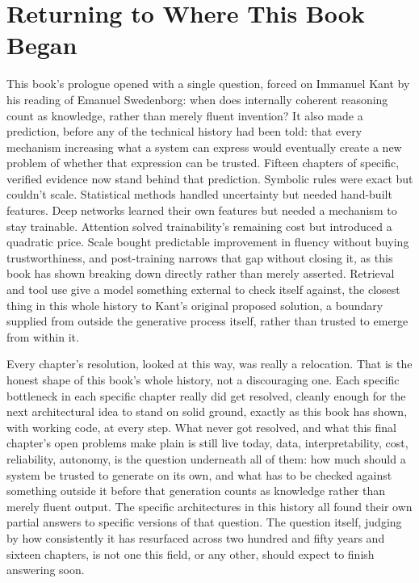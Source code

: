\section*{Returning to Where This Book Began}

This book's prologue opened with a single question, forced on Immanuel Kant by his reading of Emanuel Swedenborg: when does internally coherent reasoning count as knowledge, rather than merely fluent invention? It also made a prediction, before any of the technical history had been told: that every mechanism increasing what a system can express would eventually create a new problem of whether that expression can be trusted. Fifteen chapters of specific, verified evidence now stand behind that prediction. Symbolic rules were exact but couldn't scale. Statistical methods handled uncertainty but needed hand-built features. Deep networks learned their own features but needed a mechanism to stay trainable. Attention solved trainability's remaining cost but introduced a quadratic price. Scale bought predictable improvement in fluency without buying trustworthiness, and post-training narrows that gap without closing it, as this book has shown breaking down directly rather than merely asserted. Retrieval and tool use give a model something external to check itself against, the closest thing in this whole history to Kant's original proposed solution, a boundary supplied from outside the generative process itself, rather than trusted to emerge from within it.

Every chapter's resolution, looked at this way, was really a relocation. That is the honest shape of this book's whole history, not a discouraging one. Each specific bottleneck in each specific chapter really did get resolved, cleanly enough for the next architectural idea to stand on solid ground, exactly as this book has shown, with working code, at every step. What never got resolved, and what this final chapter's open problems make plain is still live today, data, interpretability, cost, reliability, autonomy, is the question underneath all of them: how much should a system be trusted to generate on its own, and what has to be checked against something outside it before that generation counts as knowledge rather than merely fluent output. The specific architectures in this history all found their own partial answers to specific versions of that question. The question itself, judging by how consistently it has resurfaced across two hundred and fifty years and sixteen chapters, is not one this field, or any other, should expect to finish answering soon.
